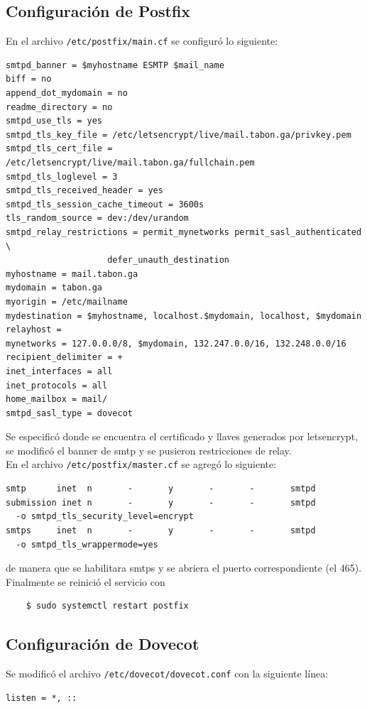\documentclass[12pt]{article}
\begin{document}
\subsection{Configuración de Postfix}
En el archivo \texttt{/etc/postfix/main.cf} se configuró lo siguiente:
\begin{verbatim}
smtpd_banner = $myhostname ESMTP $mail_name         
biff = no
append_dot_mydomain = no
readme_directory = no
smtpd_use_tls = yes
smtpd_tls_key_file = /etc/letsencrypt/live/mail.tabon.ga/privkey.pem
smtpd_tls_cert_file = /etc/letsencrypt/live/mail.tabon.ga/fullchain.pem
smtpd_tls_loglevel = 3
smtpd_tls_received_header = yes
smtpd_tls_session_cache_timeout = 3600s
tls_random_source = dev:/dev/urandom
smtpd_relay_restrictions = permit_mynetworks permit_sasl_authenticated \
                    defer_unauth_destination
myhostname = mail.tabon.ga                              
mydomain = tabon.ga
myorigin = /etc/mailname
mydestination = $myhostname, localhost.$mydomain, localhost, $mydomain
relayhost = 
mynetworks = 127.0.0.0/8, $mydomain, 132.247.0.0/16, 132.248.0.0/16
recipient_delimiter = +
inet_interfaces = all
inet_protocols = all
home_mailbox = mail/
smtpd_sasl_type = dovecot
\end{verbatim}
Se especificó donde se encuentra el certificado y llaves generados por \textsf{letsencrypt}, se modificó el banner de \textsf{smtp} y se pusieron restricciones de relay. \\
En el archivo \texttt{/etc/postfix/master.cf} se agregó lo siguiente:
\begin{verbatim}
smtp      inet  n       -       y       -       -       smtpd
submission inet n       -       y       -       -       smtpd
  -o smtpd_tls_security_level=encrypt
smtps     inet  n       -       y       -       -       smtpd
  -o smtpd_tls_wrappermode=yes
\end{verbatim}
de manera que se habilitara \textsf{smtps} y se abriera el puerto correspondiente (el 465). Finalmente se reinició el servicio con
\begin{verbatim}
    $ sudo systemctl restart postfix
\end{verbatim}

\subsection{Configuración de Dovecot}

Se modificó el archivo \texttt{/etc/dovecot/dovecot.conf} con la siguiente línea:
\begin{verbatim}
listen = *, ::
\end{verbatim}
\end{document}

